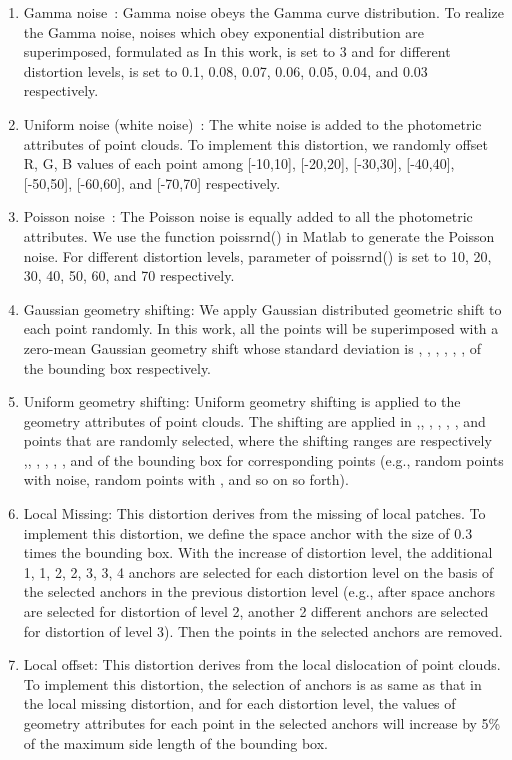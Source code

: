 \documentclass[acmsmall]{acmart}
\begin{document}
\begin{enumerate}
  \item {\sf Gamma noise~\cite{Boyat2015ImageNoise}}: Gamma noise obeys the Gamma curve distribution. To realize the Gamma noise,  noises which obey exponential distribution are superimposed, formulated as 
      In this work,  is set to 3 and for different distortion levels,  is set to 0.1, 0.08, 0.07, 0.06, 0.05, 0.04, and 0.03 respectively.
  \item {\sf Uniform noise (white noise)~\cite{Boyat2015ImageNoise,Ponomarenko2015TID2013}}: The white noise is added to the photometric attributes of point clouds. To implement this distortion, we randomly offset R, G, B values of each point among [-10,10], [-20,20], [-30,30], [-40,40], [-50,50], [-60,60], and [-70,70] respectively.
  \item {\sf Poisson noise~\cite{Boyat2015ImageNoise}}: The Poisson noise is equally added to all the photometric attributes. We use the function poissrnd() in Matlab to generate the Poisson noise. For different distortion levels, parameter  of poissrnd() is set to 10, 20, 30, 40, 50, 60, and 70 respectively.
  \item {\sf Gaussian geometry shifting}: We apply Gaussian distributed geometric shift to each point randomly. In this work, all the points will be superimposed with a zero-mean Gaussian geometry shift whose standard deviation is , , , , , ,  of the bounding box respectively.
  \item {\sf Uniform geometry shifting}: Uniform geometry shifting is applied to the geometry attributes of point clouds. The shifting are applied in ,, , , , , and  points that are randomly selected, where the shifting ranges are respectively ,, , , , , and  of the bounding box for corresponding points (e.g.,  random points with  noise,   random points with , and so on so forth).
  \item {\sf Local Missing}: This distortion derives from the missing of local patches. To implement this distortion, we define the space anchor with the size of 0.3 times the bounding box. With the increase of distortion level, the additional 1, 1, 2, 2, 3, 3, 4 anchors are selected for each distortion level on the basis of the selected anchors in the previous distortion level (e.g., after  space anchors are selected for distortion of level 2, another 2 different anchors are selected for distortion of level 3). Then the points in the selected anchors are removed.
  \item {\sf Local offset}: This distortion derives from the local dislocation of point clouds. To implement this distortion, the selection of anchors is as same as that in the local missing distortion, and for each distortion level, the values of geometry attributes for each point in the selected anchors will increase by 5\% of the maximum side length of the bounding box.

\end{enumerate}
\end{document}

